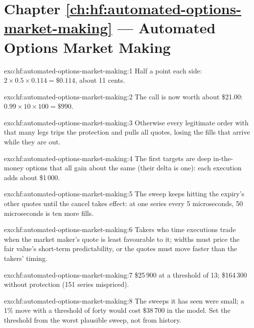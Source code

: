 \section*{Chapter \ref{ch:hf:automated-options-market-making} --- Automated Options Market Making}

\begin{solution}{exo:hf:automated-options-market-making:1}
Half a point each side: $2\times0.5\times0.114=\$0.114$, about 11 cents.
\end{solution}

\begin{solution}{exo:hf:automated-options-market-making:2}
The call is now worth about \$21.00: $0.99\times10\times100=\$990$.
\end{solution}

\begin{solution}{exo:hf:automated-options-market-making:3}
Otherwise every legitimate order with that many legs trips the protection and pulls all quotes, losing the fills that arrive while they are out.
\end{solution}

\begin{solution}{exo:hf:automated-options-market-making:4}
The first targets are deep in-the-money options that all gain about the same (their delta is one): each execution adds about \$1\,000.
\end{solution}

\begin{solution}{exo:hf:automated-options-market-making:5}
The sweep keeps hitting the expiry's other quotes until the cancel takes effect: at one series every 5 microseconds, 50 microseconds is ten more
fills.
\end{solution}

\begin{solution}{exo:hf:automated-options-market-making:6}
Takers who time executions trade when the market maker's quote is least favourable to it; widths must price the fair value's short-term
predictability, or the quotes must move faster than the takers' timing.
\end{solution}

\begin{solution}{exo:hf:automated-options-market-making:7}
\$25\,900 at a threshold of 13; \$164\,300 without protection (151 series mispriced).
\end{solution}

\begin{solution}{exo:hf:automated-options-market-making:8}
The sweeps it has seen were small; a 1\% move with a threshold of forty would cost \$38\,700 in the model. Set the threshold from the worst plausible
sweep, not from history.
\end{solution}

